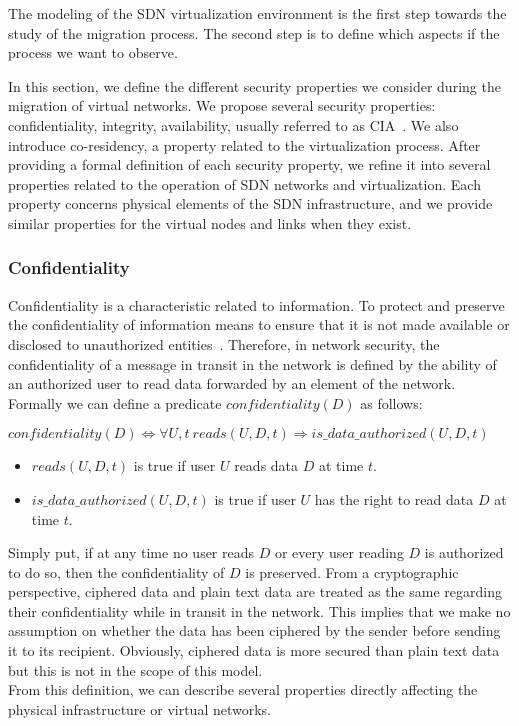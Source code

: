 \label{sec:security_prop}
The modeling of the SDN virtualization environment is the first step towards the study of the migration process. The second step is to define which aspects if the process we want to observe.

In this section, we define the different security properties we consider during the migration of virtual networks.
We propose several security properties: confidentiality, integrity, availability, usually referred to as CIA~\cite{ISO/IEC270012013}. We also introduce co-residency, a property related to the virtualization process.
After providing a formal definition of each security property, we refine it into several properties related to the operation of SDN networks and virtualization. Each property concerns physical elements of the SDN infrastructure, and we provide similar properties for the virtual nodes and links when they exist. 

\subsubsection{Confidentiality}
\label{sec:prop-conf}
Confidentiality is a characteristic related to information.
To protect and preserve the confidentiality of information means to ensure that it is not made available or disclosed to unauthorized entities~\cite{ISO/IEC270012013}.
Therefore, in network security, the confidentiality of a message in transit in the network is defined by the ability of an authorized  user to read data forwarded by an element of the network.
Formally we can define a predicate $confidentiality(D)$ as follows:

\begin{myformula}
$ confidentiality(D) \Leftrightarrow \forall U,t~reads(U,D,t) \Rightarrow is\_data\_authorized(U,D,t)$
\end{myformula}

\begin{itemize}
\item $reads(U,D,t)$ is true if user $U$ reads data $D$ at time $t$.
\item $is\_data\_authorized(U,D,t)$ is true if user $U$ has the right to read data $D$ at time $t$.
\end{itemize}
Simply put, if at any time no user reads $D$ or every user reading $D$ is authorized to do so, then the confidentiality of $D$ is preserved.
From a cryptographic perspective, ciphered data and plain text data are treated as the same regarding their confidentiality while in transit in the network.
This implies that we make no assumption on whether the data has been ciphered by the sender before sending it to its recipient.
Obviously, ciphered data is more secured than plain text data but this is not in the scope of this model.\\
From this definition, we can describe several properties directly affecting the physical infrastructure or virtual networks.



